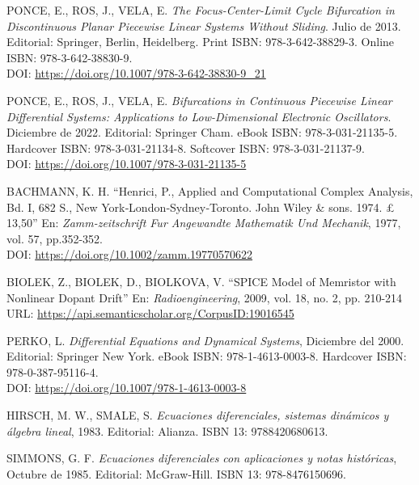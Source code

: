\documentclass[12pt,a4paper]{report} %
\begin{document}
\begin{thebibliography}{99}
		 PONCE, E., ROS, J., VELA, E. \textit{The Focus-Center-Limit Cycle Bifurcation in Discontinuous Planar Piecewise Linear Systems Without Sliding}. Julio de 2013. Editorial: Springer, Berlin, Heidelberg. Print ISBN: 978-3-642-38829-3. Online ISBN: 978-3-642-38830-9. \\DOI: \href{https://doi.org/10.1007/978-3-642-38830-9_21}{https://doi.org/10.1007/978-3-642-38830-9\_21}
		
		 PONCE, E., ROS, J., VELA, E. \textit{Bifurcations in Continuous Piecewise Linear Differential Systems: Applications to Low-Dimensional Electronic Oscillators}. Diciembre de 2022. Editorial: Springer Cham. eBook ISBN: 978-3-031-21135-5. Hardcover ISBN: 978-3-031-21134-8. Softcover ISBN: 978-3-031-21137-9. \\DOI: \href{https://doi.org/10.1007/978-3-031-21135-5}{https://doi.org/10.1007/978-3-031-21135-5}
		
		 BACHMANN, K. H. ``Henrici, P., Applied and Computational Complex Analysis, Bd. I, 682 S., New York‐London‐Sydney‐Toronto. John Wiley \& sons. 1974. £ 13,50'' En: \textit{Zamm-zeitschrift Fur Angewandte Mathematik Und Mechanik}, 1977, vol. 57, pp.352-352. \\DOI: \href{ https://doi.org/10.1002/zamm.19770570622}{ https://doi.org/10.1002/zamm.19770570622}
		
		 BIOLEK, Z., BIOLEK, D., BIOLKOVA, V. ``SPICE Model of Memristor with Nonlinear Dopant Drift'' En: \textit{Radioengineering}, 2009, vol. 18, no. 2, pp. 210-214 \\URL: \href{https://api.semanticscholar.org/CorpusID:19016545}{https://api.semanticscholar.org/CorpusID:19016545}
		
		 PERKO, L. \textit{Differential Equations and Dynamical Systems}, Diciembre del 2000. Editorial: Springer New York. eBook ISBN: 978-1-4613-0003-8. Hardcover ISBN: 978-0-387-95116-4. \\DOI: \href{https://doi.org/10.1007/978-1-4613-0003-8}{https://doi.org/10.1007/978-1-4613-0003-8}
		
		 HIRSCH, M. W., SMALE, S. \textit{Ecuaciones diferenciales, sistemas dinámicos y álgebra lineal}, 1983. Editorial: Alianza. ISBN 13: 9788420680613.
		
		 SIMMONS, G. F. \textit{Ecuaciones diferenciales con aplicaciones y notas históricas}, Octubre de 1985. Editorial: McGraw-Hill. ISBN 13: 978-8476150696.
		

\end{thebibliography}
\end{document}
